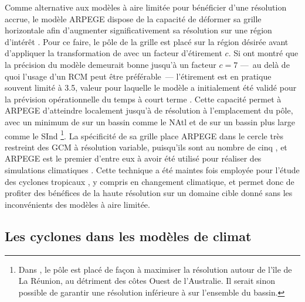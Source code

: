 \documentclass[../main.tex]{subfiles}
\begin{document}
Comme alternative aux modèles à aire limitée pour bénéficier d'une résolution accrue, le modèle ARPEGE dispose de la capacité de déformer sa grille horizontale
afin d'augmenter significativement sa résolution sur une région d'intérêt \parencite{courtier_global_1988}. Pour ce faire, le pôle de la grille est
placé sur la région désirée avant d'appliquer la transformation de \cite{schmidt_variable_1977} avec un facteur d'étirement $c$. Si \cite{caian_limits_1997}
ont montré que la précision du modèle demeurait bonne jusqu'à un facteur $c=7$ ---~au delà de quoi l'usage d'un RCM peut être préférable~--- l'étirement est en
pratique souvent limité à \num{3.5}, valeur pour laquelle le modèle a initialement été validé pour la prévision opérationnelle du temps à court terme
\parencite{benichou_validation_1992}. Cette capacité permet à ARPEGE d'atteindre localement jusqu'à  de résolution à l'emplacement du pôle, avec un
minimum de  sur un bassin comme le NAtl \parencite[][c.f \cref{fig:rotated_streched}]{chauvin_future_2020} et de  sur un bassin plus large comme
le SInd \parencite{cattiaux_projected_2020}\footnote{Dans \cite{cattiaux_projected_2020}, le pôle est placé de façon à maximiser la résolution autour de l'île
de La Réunion, au détriment des côtes Ouest de l'Australie. Il serait sinon possible de garantir une résolution inférieure à  sur l'ensemble du bassin.}.
La spécificité de sa grille place ARPEGE dans le cercle très restreint des GCM à résolution variable, puisqu'ils sont au nombre de cinq
\parencite{mcgregor_recent_2013}, et ARPEGE est le premier d'entre eux à avoir été utilisé pour réaliser des simulations climatiques
\parencite{deque_high_1995}. Cette technique a été maintes fois employée pour l'étude des cyclones tropicaux
\parencite{chauvin_response_2006,chauvin_atlantic_2017,chauvin_future_2020,daloz_impact_2012,cattiaux_projected_2020}, y compris en changement climatique, et
permet donc de profiter des bénéfices de la haute résolution sur un domaine cible donné sans les inconvénients des modèles à aire limitée.

\subsection{Les cyclones dans les modèles de climat}\label{sec:cyclones_dans_modèles}
\end{document}
